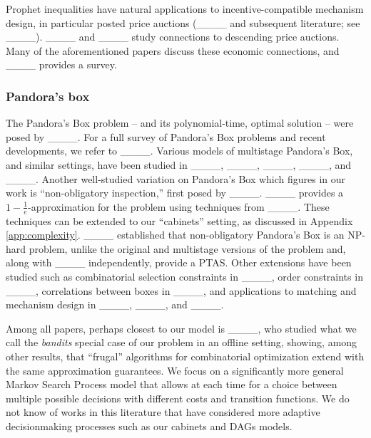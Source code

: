 Prophet inequalities have natural applications to incentive-compatible mechanism design, in particular posted price auctions (____ and subsequent literature; see ____).
____ and ____ study connections to descending price auctions.
Many of the aforementioned papers discuss these economic connections, and ____ provides a survey.

\subsubsection{Pandora's box}
The Pandora's Box problem -- and its polynomial-time, optimal solution -- were posed by ____.
For a full survey of Pandora's Box problems and recent developments, we refer to ____.
Various models of multistage Pandora's Box, and similar settings, have been studied in ____, ____, ____, ____, and ____.
Another well-studied variation on Pandora's Box which figures in our work is ``non-obligatory inspection,'' first posed by ____. ____ provides a $1-\frac{1}{e}$-approximation for the problem
using techniques from ____.
These techniques can be extended to our ``cabinets'' setting, as discussed in Appendix \ref{app:complexity}.
____ established that non-obligatory Pandora's Box is an NP-hard problem, unlike the original and multistage versions of the problem and, along with ____ independently, provide a PTAS.
Other extensions have been studied such as combinatorial selection constraints in ____, order constraints in ____, correlations between boxes in ____, and applications to matching and mechanism design in ____,  ____, and ____.

Among all papers, perhaps closest to our model is ____, who studied what we call the \emph{bandits} special case of our problem in an offline setting, showing, among other results, that ``frugal'' algorithms for combinatorial optimization extend with the same approximation guarantees.
We focus on a significantly more general Markov Search Process model that allows at each time for a choice between multiple possible decisions with different costs and transition functions.
We do not know of works in this literature that have considered more adaptive decisionmaking processes such as our cabinets and DAGs models.